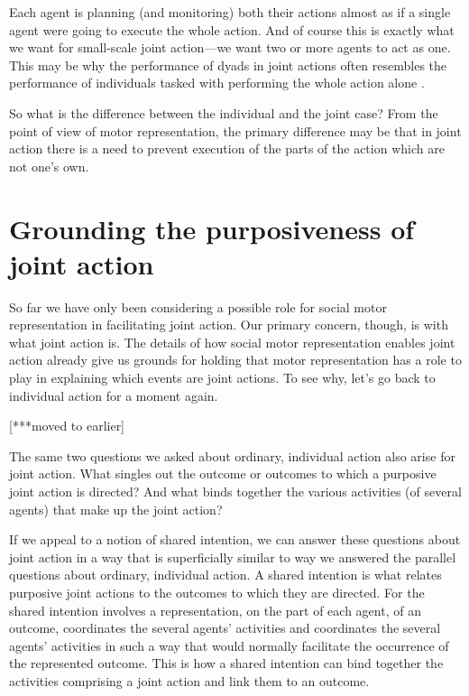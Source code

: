 \documentclass[12pt,\papersize]{extarticle}
\begin{document}
Each agent is planning (and monitoring) both their actions almost as if a single agent were going to execute the whole action.
And of course this is exactly what we want for small-scale joint action---we want two or more agents to act as one.
This may be why the performance of dyads in joint actions often resembles the performance of individuals tasked with performing the whole action alone \citep{Knoblich:2003nf}.

So what is the difference between the individual and the joint case?  From the point of view of motor representation, the primary difference may be that in joint action there is a need to prevent execution of the parts of the action which are not one’s own.



\section{Grounding the purposiveness of joint action}
So far we have only been considering a possible role for social motor representation in facilitating joint action.  
Our primary concern, though, is with what joint action is.
The details of how 
social motor representation enables joint action
 already give us grounds for holding that motor representation has a role to play in explaining which events are joint actions.
To see why,
let’s go back to individual action for a moment again.

[***moved to earlier]

The same two questions we asked about ordinary, individual action also arise for joint action.
What singles out the outcome or outcomes to which a purposive joint action is directed?
And what binds together the various activities (of several agents) that make up the joint action?

If we appeal to a notion of shared intention,
we can answer these questions about joint action in a way that is superficially similar to way we answered the parallel questions about ordinary, individual action.
A shared intention is what relates purposive joint actions to the outcomes to which they are directed.
For the shared intention 
involves a representation, on the part of each agent, of an outcome,
coordinates the several agents’ activities
and 
coordinates the several agents’ activities in such a way that would normally facilitate the occurrence of the represented outcome.
This is how a shared intention can bind together the activities comprising a joint action and link them to an outcome.
\end{document}
